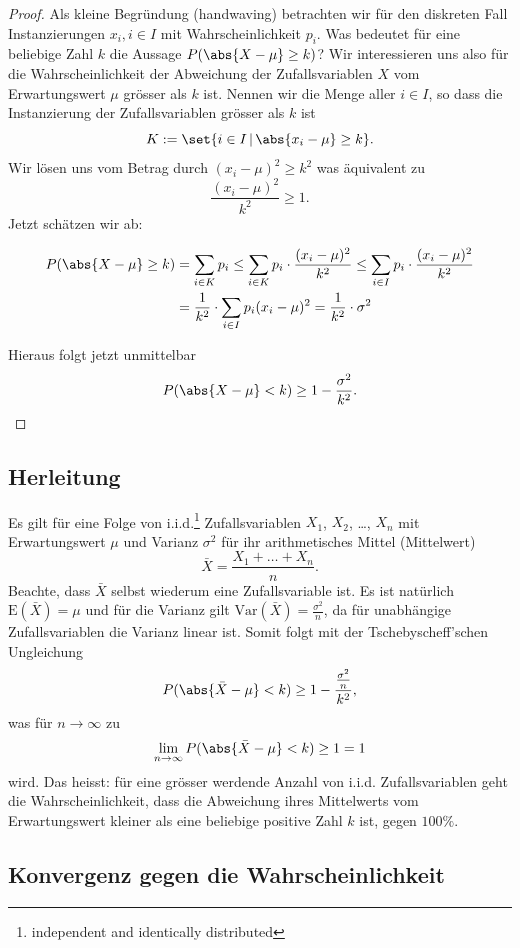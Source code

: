 \documentclass[%
11pt,%
twoside,%
titlepage,%
german,%
headsepline%
]{scrartcl}
\begin{document}
\begin{proof}
Als kleine Begründung (handwaving) betrachten wir für den diskreten Fall Instanzierungen $x_i, i\in I$ mit Wahrscheinlichkeit $p_i$. Was bedeutet für eine beliebige Zahl $k$ die Aussage $P(\abs{X-\mu}\geq k)$? Wir interessieren uns also für die Wahrscheinlichkeit der Abweichung der Zufallsvariablen $X$ vom Erwartungswert $\mu$ grösser als $k$ ist. Nennen wir die Menge aller $i\in I$, so dass die Instanzierung der Zufallsvariablen grösser als $k$ ist
$$K:=\set{i\in I\,|\,\abs{x_i-\mu}\geq k}.$$
Wir lösen uns vom Betrag durch $(x_i-\mu)^2\geq k^2$ was äquivalent zu
$$\frac{(x_i-\mu)^2}{k^2}\geq 1.$$
Jetzt schätzen wir ab:

\begin{align*}
    P(\abs{X-\mu}\geq k) &= \sum_{i\in K}p_i\leq\sum_{i\in K}p_i\cdot\frac{(x_i-\mu)^2}{k^2}\leq\sum_{i\in I}p_i\cdot\frac{(x_i-\mu)^2}{k^2}\\
    &= \frac{1}{k^2}\cdot\sum_{i\in I}p_i(x_i-\mu)^2 = \frac{1}{k^2}\cdot\sigma^2
\end{align*}

Hieraus folgt jetzt unmittelbar
$$P(\abs{X-\mu}<k) \geq 1 - \frac{\sigma^2}{k^2}.$$
\end{proof}

\subsection{Herleitung}

Es gilt für eine Folge von i.i.d.\footnote{independent and identically distributed} Zufallsvariablen $X_1$, $X_2$, \dots, $X_n$ mit Erwartungswert $\mu$ und Varianz $\sigma^2$ für ihr arithmetisches Mittel (Mittelwert)
$$\bar{X}=\frac{X_1+\dots+X_n}{n}.$$
Beachte, dass $\bar{X}$ selbst wiederum eine Zufallsvariable ist. Es ist natürlich $\mathrm{E}(\bar{X})=\mu$ und für die Varianz gilt $\mathrm{Var}(\bar{X})=\frac{\sigma^2}{n}$, da für unabhängige Zufallsvariablen die Varianz linear ist. Somit folgt mit der Tschebyscheff'schen Ungleichung
$$P(\abs{\bar{X}-\mu}<k) \geq 1-\frac{\frac{\sigma^2}{n}}{k^2},$$
was für $n\to\infty$ zu
$$\lim_{n\to\infty}P(\abs{\bar{X}-\mu}<k) \geq 1=1$$
wird. Das heisst: für eine grösser werdende Anzahl von i.i.d. Zufallsvariablen geht die Wahrscheinlichkeit, dass die Abweichung ihres Mittelwerts vom Erwartungswert kleiner als eine beliebige positive Zahl $k$ ist, gegen $100\%$.

\subsection{Konvergenz gegen die Wahrscheinlichkeit}
\end{document}
